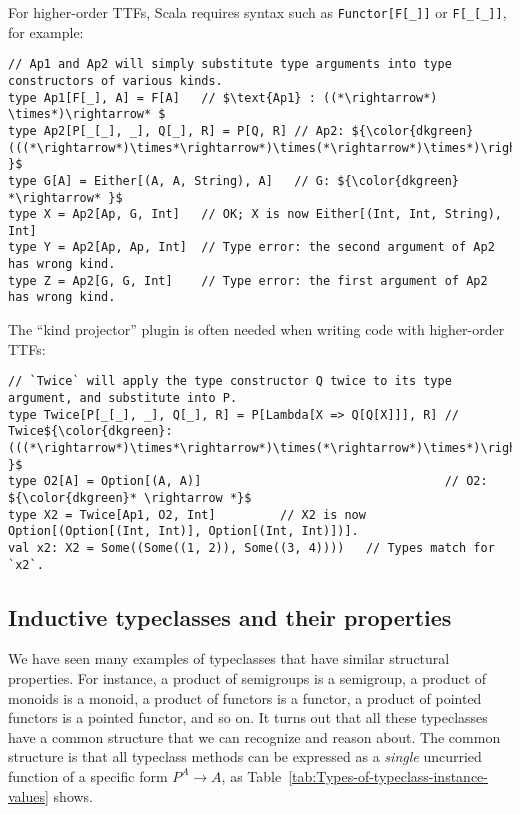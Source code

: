 For higher-order TTFs, Scala requires syntax such as \lstinline!Functor[F[_]]!
or \lstinline!F[_[_]]!, for example:
\begin{lstlisting}[mathescape=true]
// Ap1 and Ap2 will simply substitute type arguments into type constructors of various kinds.
type Ap1[F[_], A] = F[A]   // $\text{Ap1} : ((*\rightarrow*) \times*)\rightarrow* $
type Ap2[P[_[_], _], Q[_], R] = P[Q, R] // Ap2: ${\color{dkgreen}(((*\rightarrow*)\times*\rightarrow*)\times(*\rightarrow*)\times*)\rightarrow* }$
type G[A] = Either[(A, A, String), A]   // G: ${\color{dkgreen} *\rightarrow* }$
type X = Ap2[Ap, G, Int]   // OK; X is now Either[(Int, Int, String), Int]
type Y = Ap2[Ap, Ap, Int]  // Type error: the second argument of Ap2 has wrong kind.
type Z = Ap2[G, G, Int]    // Type error: the first argument of Ap2 has wrong kind.
\end{lstlisting}
The ``kind projector'' plugin is often needed when writing code
with higher-order TTFs:
\begin{lstlisting}[mathescape=true]
   // `Twice` will apply the type constructor Q twice to its type argument, and substitute into P.
type Twice[P[_[_], _], Q[_], R] = P[Lambda[X => Q[Q[X]]], R] // Twice${\color{dkgreen}:(((*\rightarrow*)\times*\rightarrow*)\times(*\rightarrow*)\times*)\rightarrow* }$
type O2[A] = Option[(A, A)]                                  // O2: ${\color{dkgreen}* \rightarrow *}$
type X2 = Twice[Ap1, O2, Int]         // X2 is now Option[(Option[(Int, Int)], Option[(Int, Int)])].
val x2: X2 = Some((Some((1, 2)), Some((3, 4))))   // Types match for `x2`.
\end{lstlisting}


\subsection{Inductive typeclasses and their properties\label{subsec:Inductive-typeclasses}}

We have seen many examples of typeclasses that have similar structural
properties. For instance, a product of semigroups is a semigroup,
a product of monoids is a monoid, a product of functors is a functor,
a product of pointed functors is a pointed functor, and so on. It
turns out that all these typeclasses have a common structure that
we can recognize and reason about. The common structure is that all
typeclass methods can be expressed as a \emph{single} uncurried function
of a specific form $P^{A}\rightarrow A$, as Table~\ref{tab:Types-of-typeclass-instance-values}
shows.

